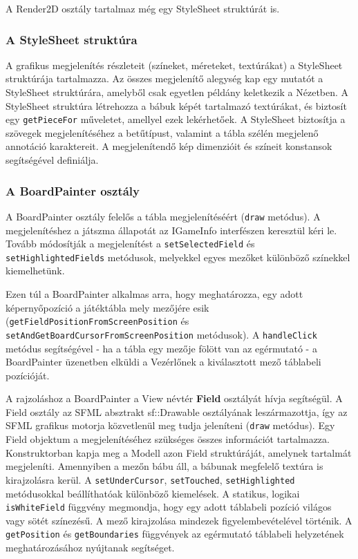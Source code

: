 \documentclass[12pt, twoside]{report}
\begin{document}
A Render2D osztály tartalmaz még egy StyleSheet struktúrát is.

\subsubsection{A StyleSheet struktúra}

A grafikus megjelenítés részleteit (színeket, méreteket, textúrákat) a StyleSheet struktúrája tartalmazza. Az összes megjelenítő alegység kap egy mutatót a StyleSheet struktúrára, amelyből csak egyetlen példány keletkezik a Nézetben. A StyleSheet struktúra létrehozza a bábuk képét tartalmazó textúrákat, és biztosít egy {\tt getPieceFor} műveletet, amellyel ezek lekérhetőek. A StyleSheet biztosítja a szövegek megjelenítéséhez a betűtípust, valamint a tábla szélén megjelenő annotáció karaktereit. A megjelenítendő kép dimenzióit és színeit konstansok segítségével definiálja. 

\subsubsection{A BoardPainter osztály}

A BoardPainter osztály felelős a tábla megjelenítéséért ({\tt draw} metódus). A megjelenítéshez a játszma állapotát az IGameInfo interfészen keresztül kéri le. Tovább módosítják a megjelenítést a {\tt setSelectedField} és {\tt setHighlightedFields} metódusok, melyekkel egyes mezőket különböző színekkel kiemelhetünk.

Ezen túl a BoardPainter alkalmas arra, hogy meghatározza, egy adott képernyőpozíció a játéktábla mely mezőjére esik ({\tt getFieldPositionFromScreenPosition} és {\tt setAndGetBoardCursorFromScreenPosition} metódusok). A {\tt handleClick} metódus segítségével - ha a tábla egy mezője fölött van az egérmutató - a BoardPainter üzenetben elküldi a Vezérlőnek a kiválasztott mező táblabeli pozícióját.

A rajzoláshoz a BoardPainter a View névtér \textbf{Field} osztályát hívja segítségül. A Field osztály az SFML absztrakt sf::Drawable osztályának leszármazottja, így az SFML grafikus motorja közvetlenül meg tudja jeleníteni ({\tt draw} metódus). Egy Field objektum a megjelenítéséhez szükséges összes információt tartalmazza. Konstruktorban kapja meg a Modell azon Field struktúráját, amelynek tartalmát megjeleníti. Amennyiben a mezőn bábu áll, a bábunak megfelelő textúra is kirajzolásra kerül. A {\tt setUnderCursor}, {\tt setTouched}, {\tt setHighlighted} metódusokkal beállíthatóak különböző kiemelések. A statikus, logikai {\tt isWhiteField} függvény megmondja, hogy egy adott táblabeli pozíció világos vagy sötét színezésű. A mező kirajzolása mindezek figyelembevételével történik. A {\tt getPosition} és {\tt getBoundaries} függvények az egérmutató táblabeli helyzetének meghatározásához nyújtanak segítséget.
\end{document}
